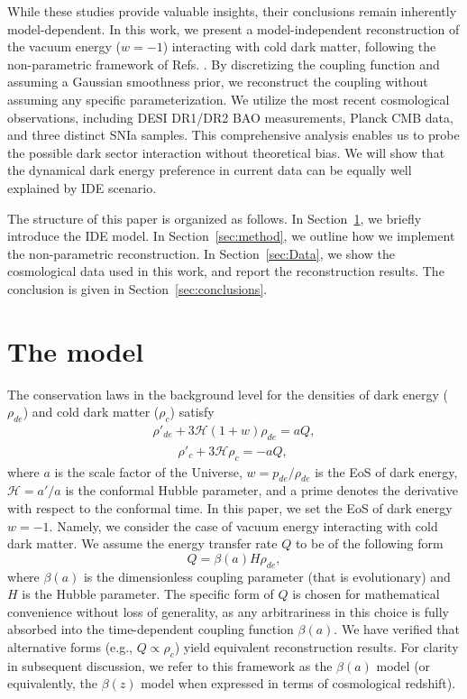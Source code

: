 \documentclass[a4paper,11pt]{article}
\begin{document}
While these studies provide valuable insights, their conclusions remain inherently model-dependent. In this work, we present a model-independent reconstruction of the vacuum energy ($w=-1$) interacting with cold dark matter, following the non-parametric framework of Refs. \cite{Crittenden:2005wj,Zhao:2012aw}. By discretizing the coupling function and assuming a Gaussian smoothness prior, we reconstruct the coupling without assuming any specific parameterization. We utilize the most recent cosmological observations, including DESI DR1/DR2 BAO measurements, Planck CMB data, and three distinct SNIa samples. This comprehensive analysis enables us to probe the possible dark sector interaction without theoretical bias. We will show that the dynamical dark energy preference in current data can be equally well explained by IDE scenario. 
 
The structure of this paper is organized as follows. In Section~\ref{sec:GeneralEqs}, we briefly introduce the IDE model. In Section~\ref{sec:method}, we outline how we implement the non-parametric reconstruction. In Section~\ref{sec:Data}, we show the cosmological data used in this work, and report the reconstruction results. The conclusion is given in Section~\ref{sec:conclusions}.


\section{The model}\label{sec:GeneralEqs}
The conservation laws in the background level for the densities of dark energy ($\rho_{de}$) and cold dark matter ($\rho_{c}$) satisfy
\begin{gather}
  \rho'_{de} +3\mathcal{H}(1+w)\rho_{de}= aQ,\label{eq:rhodedot}\\
  \qquad\rho'_{c} +3\mathcal{H}\rho_{c}=- aQ,\label{eq:rhocdot}
\end{gather}
where $a$ is the scale factor of the Universe, $w={p_{de}/\rho_{de}}$ is the EoS of dark energy, $\mathcal{H}=a'/a$ is the conformal Hubble parameter, and a prime denotes the derivative with respect to the conformal time. In this paper, we set the EoS of dark energy $w=-1$. Namely, we consider the case of vacuum energy interacting with cold dark matter. We assume the energy transfer rate $Q$ to be of the following form
\begin{equation}
  Q = \beta(a)H\rho_{de},\label{eq:Qenergy}
\end{equation}
where $\beta(a)$ is the dimensionless coupling parameter (that is evolutionary) and $H$ is the Hubble parameter. The specific form of $Q$ is chosen for mathematical convenience without loss of generality, as any arbitrariness in this choice is fully absorbed into the time-dependent coupling function $\beta(a)$. We have verified that alternative forms (e.g., $Q\propto\rho_{c}$) yield equivalent reconstruction results. For clarity in subsequent discussion, we refer to this framework as the $\beta(a)$ model (or equivalently, the $\beta(z)$ model when expressed in terms of cosmological redshift).
\end{document}
